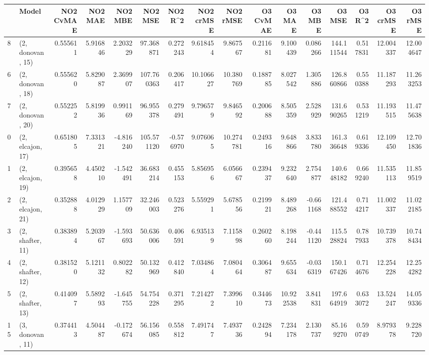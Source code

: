 \begin{tabular}{llrrrrrrrrrrrrrr}
\toprule
{} &             Model &  NO2 CvMAE &   NO2 MAE &   NO2 MBE &     NO2 MSE &   NO2 R\textasciicircum2 &  NO2 crMSE &   NO2 rMSE &  O3 CvMAE &     O3 MAE &    O3 MBE &      O3 MSE &    O3 R\textasciicircum2 &   O3 crMSE &    O3 rMSE \\
\midrule
8  &  (2, donovan, 15) &   0.555611 &  5.916846 &  2.203229 &   97.368871 &  0.272243 &   9.618454 &   9.867567 &  0.211681 &   9.100439 &  0.086266 &  144.111544 &  0.517831 &  12.004337 &  12.004647 \\
6  &  (2, donovan, 18) &   0.555620 &  5.829087 &  2.369907 &  107.760363 &  0.206417 &  10.106627 &  10.380769 &  0.188785 &   8.027542 &  1.305886 &  126.860866 &  0.550388 &  11.187293 &  11.263253 \\
7  &  (2, donovan, 20) &   0.552252 &  5.819936 &  0.991169 &   96.955378 &  0.279491 &   9.796579 &   9.846592 &  0.200688 &   8.505359 &  2.528929 &  131.690265 &  0.531219 &  11.193515 &  11.475638 \\
0  &  (2, elcajon, 17) &   0.651805 &  7.331321 & -4.816240 &  105.571120 & -0.576970 &   9.076065 &  10.274781 &  0.249316 &   9.648866 &  3.833780 &  161.336648 &  0.619336 &  12.109450 &  12.701836 \\
1  &  (2, elcajon, 19) &   0.395658 &  4.450210 & -1.542491 &   36.683214 &  0.455153 &   5.856956 &   6.056667 &  0.239437 &   9.232640 &  2.754877 &  140.648182 &  0.669240 &  11.535113 &  11.859519 \\
2  &  (2, elcajon, 21) &   0.352888 &  4.012929 &  1.157709 &   32.246003 &  0.523276 &   5.559291 &   5.678556 &  0.219921 &   8.489268 & -0.661168 &  121.488552 &  0.714217 &  11.002337 &  11.022185 \\
3  &  (2, shafter, 11) &   0.383894 &  5.203967 & -1.593693 &   50.636006 &  0.406591 &   6.935139 &   7.115898 &  0.260260 &   8.198244 & -0.441120 &  115.528824 &  0.787933 &  10.739378 &  10.748434 \\
4  &  (2, shafter, 12) &   0.381520 &  5.121132 &  0.802282 &   50.132969 &  0.412840 &   7.034864 &   7.080464 &  0.306487 &   9.655634 & -0.036319 &  150.167426 &  0.714676 &  12.254228 &  12.254282 \\
5  &  (2, shafter, 13) &   0.414097 &  5.589293 & -1.645755 &   54.754228 &  0.371295 &   7.214272 &   7.399610 &  0.344673 &  10.922538 &  3.841831 &  197.664919 &  0.633072 &  13.524247 &  14.059336 \\
15 &  (3, donovan, 11) &   0.374413 &  4.504487 & -0.172674 &   56.156085 &  0.558812 &   7.491747 &   7.493736 &  0.242894 &   7.234178 &  2.130737 &   85.169270 &  0.590749 &   8.979378 &   9.228720 \\

\end{tabular}
